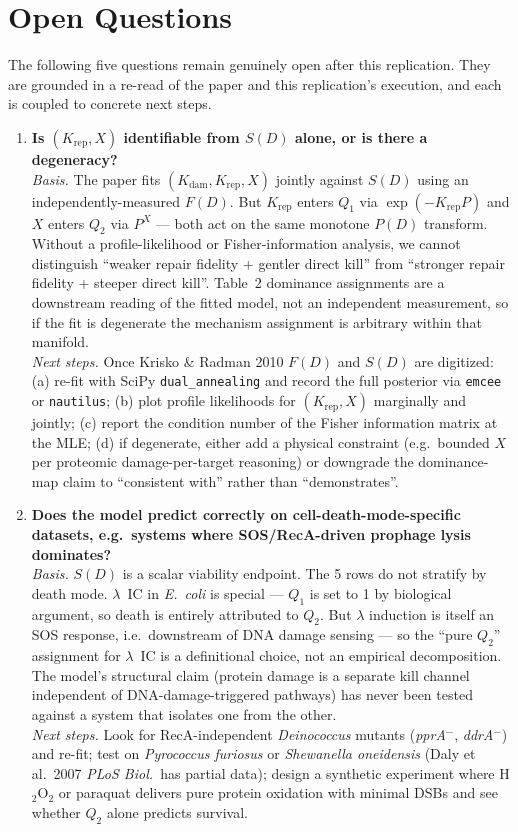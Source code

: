 \section{Open Questions}
The following five questions remain genuinely open after this replication. They are grounded
in a re-read of the paper and this replication's execution, and each is coupled to concrete
next steps.

\begin{enumerate}
\item \textbf{Is $(K_{\text{rep}}, X)$ identifiable from $S(D)$ alone, or is there a degeneracy?}\\
\emph{Basis.} The paper fits $(K_{\text{dam}}, K_{\text{rep}}, X)$ jointly against $S(D)$ using
an independently-measured $F(D)$. But $K_{\text{rep}}$ enters $Q_1$ via $\exp(-K_{\text{rep}} P)$
and $X$ enters $Q_2$ via $P^X$ --- both act on the same monotone $P(D)$ transform. Without a
profile-likelihood or Fisher-information analysis, we cannot distinguish ``weaker repair fidelity
+ gentler direct kill'' from ``stronger repair fidelity + steeper direct kill''. Table~2
dominance assignments are a downstream reading of the fitted model, not an independent
measurement, so if the fit is degenerate the mechanism assignment is arbitrary within that
manifold.\\
\emph{Next steps.} Once Krisko \& Radman 2010 $F(D)$ and $S(D)$ are digitized: (a) re-fit with
SciPy \texttt{dual\_annealing} and record the full posterior via \texttt{emcee} or
\texttt{nautilus}; (b) plot profile likelihoods for $(K_{\text{rep}}, X)$ marginally and
jointly; (c) report the condition number of the Fisher information matrix at the MLE;
(d) if degenerate, either add a physical constraint (e.g.\ bounded $X$ per proteomic
damage-per-target reasoning) or downgrade the dominance-map claim to ``consistent with''
rather than ``demonstrates''.

\item \textbf{Does the model predict correctly on cell-death-mode-specific datasets, e.g.\ systems where SOS/RecA-driven prophage lysis dominates?}\\
\emph{Basis.} $S(D)$ is a scalar viability endpoint. The 5 rows do not stratify by death
mode. $\lambda$~IC in \textit{E.~coli} is special --- $Q_1$ is set to 1 by biological argument,
so death is entirely attributed to $Q_2$. But $\lambda$ induction is itself an SOS response,
i.e.\ downstream of DNA damage sensing --- so the ``pure $Q_2$'' assignment for $\lambda$~IC
is a definitional choice, not an empirical decomposition. The model's structural claim
(protein damage is a separate kill channel independent of DNA-damage-triggered pathways) has
never been tested against a system that isolates one from the other.\\
\emph{Next steps.} Look for RecA-independent \textit{Deinococcus} mutants (\textit{pprA$^-$},
\textit{ddrA$^-$}) and re-fit; test on \textit{Pyrococcus furiosus} or \textit{Shewanella
oneidensis} (Daly et al.\ 2007 \emph{PLoS Biol.\ }has partial data); design a synthetic experiment
where H$_2$O$_2$ or paraquat delivers pure protein oxidation with minimal DSBs and see whether
$Q_2$ alone predicts survival.


\end{enumerate}
